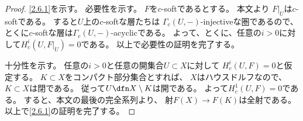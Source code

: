\documentclass[uplatex,dvipdfmx]{jsarticle}
\begin{document}
\begin{proof}
  \ref{2.6.1}を示す。
  必要性を示す。
  \(F\)を\(c\)-softであるとする。
  本文\cite[Proposition 2.5.7 (i)]{kashiwara2002sheaves}より
  \(F|_U\)は\(c\)-softである。
  すると\(U\)上の\(c\)-softな層たちは
  \(\Gamma_c(U,-)\)-injectiveな圏であるので、
  とくに\(c\)-softな層は\(\Gamma_c(U,-)\)-acyclicである。
  よって、とくに、任意の\(i>0\)に対して\(H^i_c(U,F|_U)=0\)である。
  以上で必要性の証明を完了する。

  十分性を示す。
  任意の\(i>0\)と任意の開集合\(U\subset X\)に対して
  \(H^i_c(U,F)=0\)と仮定する。
  \(K\subset X\)をコンパクト部分集合とすれば、
  \(X\)はハウスドルフなので、\(K\subset X\)は閉である。
  従って\(U\dfn X\setminus K\)は開である。
  よって\(H^1_c(U,F)=0\)である。
  すると、本文\cite[Remark 2.6.10]{kashiwara2002sheaves}の最後の完全系列より、
  射\(F(X)\to F(K)\)は全射である。
  以上で\ref{2.6.1}の証明を完了する。


\end{proof}
\end{document}
